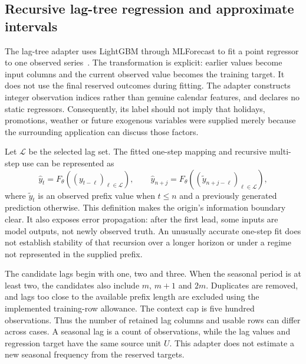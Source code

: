 \subsection{Recursive lag-tree regression and approximate intervals}
\label{sec:method-lag-trees}
The lag-tree adapter uses LightGBM through MLForecast to fit a point regressor to one observed series~\cite{lightgbm,mlforecast}. The transformation is explicit: earlier values become input columns and the current observed value becomes the training target. It does not use the final reserved outcomes during fitting. The adapter constructs integer observation indices rather than genuine calendar features, and declares no static regressors. Consequently, its label should not imply that holidays, promotions, weather or future exogenous variables were supplied merely because the surrounding application can discuss those factors.

Let $\mathcal L$ be the selected lag set. The fitted one-step mapping and recursive multi-step use can be represented as
\begin{equation}\label{eq:report-lag-map}
\widehat y_t=F_\theta((y_{t-\ell})_{\ell\in\mathcal L}),\qquad
\widehat y_{n+j}=F_\theta((\widetilde y_{n+j-\ell})_{\ell\in\mathcal L}),
\end{equation}
where $\widetilde y_t$ is an observed prefix value when $t\le n$ and a previously generated prediction otherwise. This definition makes the origin's information boundary clear. It also exposes error propagation: after the first lead, some inputs are model outputs, not newly observed truth. An unusually accurate one-step fit does not establish stability of that recursion over a longer horizon or under a regime not represented in the supplied prefix.

The candidate lags begin with one, two and three. When the seasonal period is at least two, the candidates also include $m$, $m+1$ and $2m$. Duplicates are removed, and lags too close to the available prefix length are excluded using the implemented training-row allowance. The context cap is five hundred observations. Thus the number of retained lag columns and usable rows can differ across cases. A seasonal lag is a count of observations, while the lag values and regression target have the same source unit $U$. This adapter does not estimate a new seasonal frequency from the reserved targets.

